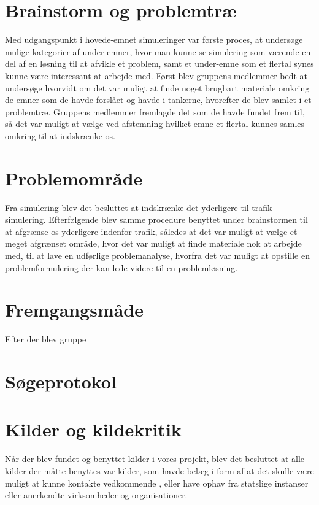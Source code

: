 \section{Brainstorm og problemtræ}

Med udgangspunkt i hovede-emnet simuleringer var første proces, at undersøge mulige kategorier af under-emner, hvor man kunne se simulering som værende en del af en løsning til at afvikle et problem, samt et under-emne som et flertal synes kunne være interessant at arbejde med. Først blev gruppens medlemmer bedt at undersøge hvorvidt om det var muligt at finde noget brugbart materiale omkring de emner som de havde forslået og havde i tankerne, hvorefter de blev samlet i et problemtræ. Gruppens medlemmer fremlagde det som de havde fundet frem til, så det var muligt at vælge ved afstemning hvilket emne et flertal kunnes samles omkring til at indskrænke os.

\section{Problemområde}

Fra simulering blev det besluttet at indskrænke det yderligere til trafik simulering. Efterfølgende blev samme procedure benyttet under brainstormen til at afgrænse os yderligere indenfor trafik, således at det var muligt at vælge et meget afgrænset område, hvor det var muligt at finde materiale nok at arbejde med, til at lave en udførlige problemanalyse, hvorfra det var muligt at opstille en problemformulering der kan lede videre til en problemløsning. 

\section{Fremgangsmåde}

Efter der blev gruppe

\section{Søgeprotokol}

\section{Kilder og kildekritik}

Når der blev fundet og benyttet kilder i vores projekt, blev det besluttet at alle kilder der måtte benyttes var kilder, som havde belæg i form af at det skulle være muligt at kunne kontakte vedkommende , eller have ophav fra statslige instanser eller anerkendte virksomheder og organisationer. 